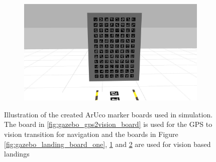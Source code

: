 \documentclass[../Head/report.tex]{subfiles}
\begin{document}
\begin{figure}[H]
\begin{subfigure}[t]{.22\textwidth}
        \caption{}
        \label{fig:gazebo_landing_board_two}
    \end{subfigure}
         \hspace{0.2em}
    \begin{subfigure}[t]{.22\textwidth}
        \centering
        \includegraphics[width=\textwidth]{../Figures/3d-modeling/gazebo_landing_board_three.jpg}
        \caption{}
        \label{fig:gazebo_landing_board_three}
    \end{subfigure}
    \caption{Illustration of the created ArUco marker boards used in simulation. The board in \ref{fig:gazebo_gps2vision_board} is used for the GPS to vision transition for navigation and the boards in Figure \ref{fig:gazebo_landing_board_one}, \ref{fig:gazebo_landing_board_two} and \ref{fig:gazebo_landing_board_three} are used for vision based landings}  
    \label{fig:gazebo_aruco_marker_boards}
\end{figure}      
\end{document}
